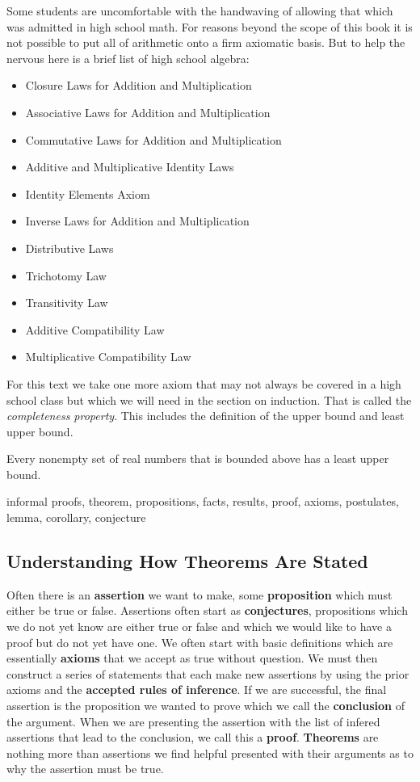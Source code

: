 Some students are uncomfortable with the handwaving of allowing that which was admitted in high school math. For reasons beyond the scope of this book it is not possible to put all of arithmetic onto a firm axiomatic basis. But to help the nervous here is a brief list of high school algebra: 
\begin{itemize}
  \item Closure Laws for Addition and Multiplication
  \item Associative Laws for Addition and Multiplication
  \item Commutative Laws for Addition and Multiplication
  \item Additive and Multiplicative Identity Laws
  \item Identity Elements Axiom
  \item Inverse Laws for Addition and Multiplication
  \item Distributive Laws
  \item Trichotomy Law
  \item Transitivity Law
  \item Additive Compatibility Law
  \item Multiplicative Compatibility Law
 \end{itemize}

For this text we take one more axiom that may not always be covered in a high school class but which we will need in the section on induction. That is called the \textit{completeness property}. This includes the definition of the upper bound and least upper bound. 

\begin{definition}\label{CompletenessProperty}
Every nonempty set of real numbers that is bounded above has a least upper bound.
\end{definition}


    informal proofs, theorem, propositions, facts, results, proof, axioms, postulates, lemma, corollary, conjecture
    \subsection {Understanding How Theorems Are Stated}
Often there is an \textbf{assertion} we want to make, some \textbf{proposition} which must either be true or false. Assertions often start as \textbf{conjectures}, propositions which we do not yet know are either true or false and which we would like to have a proof but do not yet have one. We often start with basic definitions which are essentially \textbf{axioms} that we accept as true without question. We must then construct a series of statements that each make new assertions by using the prior axioms and the \textbf{accepted rules of inference}. If we are successful, the final assertion is the proposition we wanted to prove which we call the \textbf{conclusion} of the argument. When we are presenting the assertion with the list of infered assertions that lead to the conclusion, we call this a \textbf{proof}. \textbf{Theorems} are nothing more than assertions we find helpful presented with their arguments as to why the assertion must be true. 

